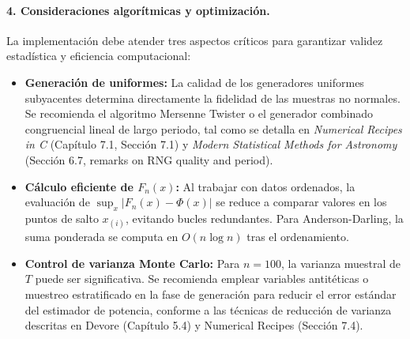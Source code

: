 \documentclass[12pt]{article}
\begin{document}
\paragraph{4. Consideraciones algorítmicas y optimización.}
La implementación debe atender tres aspectos críticos para garantizar validez estadística y eficiencia computacional:
\begin{itemize}
    \item \textbf{Generación de uniformes:} La calidad de los generadores uniformes subyacentes determina directamente la fidelidad de las muestras no normales. Se recomienda el algoritmo Mersenne Twister o el generador combinado congruencial lineal de largo periodo, tal como se detalla en \textit{Numerical Recipes in C} (Capítulo 7.1, Sección 7.1) y \textit{Modern Statistical Methods for Astronomy} (Sección 6.7, remarks on RNG quality and period).
    \item \textbf{Cálculo eficiente de $F_n(x)$:} Al trabajar con datos ordenados, la evaluación de $\sup_x |F_n(x) - \Phi(x)|$ se reduce a comparar valores en los puntos de salto $x_{(i)}$, evitando bucles redundantes. Para Anderson-Darling, la suma ponderada se computa en $O(n \log n)$ tras el ordenamiento.
    \item \textbf{Control de varianza Monte Carlo:} Para $n=100$, la varianza muestral de $T$ puede ser significativa. Se recomienda emplear variables antitéticas o muestreo estratificado en la fase de generación para reducir el error estándar del estimador de potencia, conforme a las técnicas de reducción de varianza descritas en Devore (Capítulo 5.4) y Numerical Recipes (Sección 7.4).
\end{itemize}
\end{document}
